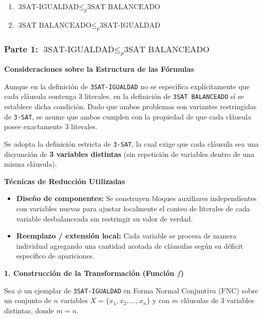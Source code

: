 \begin{enumerate}[label=\arabic*., leftmargin=*]
    \item $\text{3SAT-IGUALDAD} \le_p \text{3SAT BALANCEADO}$
    \item $\text{3SAT BALANCEADO} \le_p \text{3SAT-IGUALDAD}$
\end{enumerate}

\subsubsection*{Parte 1: $\text{3SAT-IGUALDAD} \le_p \text{3SAT BALANCEADO}$}

\vspace{0.3cm}
\noindent\textbf{Consideraciones sobre la Estructura de las Fórmulas}

Aunque en la definición de \texttt{3SAT-IGUALDAD} no se especifica explícitamente que cada cláusula contenga $3$ literales, en la definición de \texttt{3SAT BALANCEADO} sí se establece dicha condición. Dado que ambos problemas son variantes restringidas de \texttt{3-SAT}, se asume que ambos cumplen con la propiedad de que cada cláusula posee exactamente $3$ literales.

Se adopta la definición estricta de \texttt{3-SAT}, la cual exige que cada cláusula sea una disyunción de \textbf{3 variables distintas} (sin repetición de variables dentro de una misma cláusula).


\vspace{0.3cm}
\noindent\textbf{Técnicas de Reducción Utilizadas}

\begin{itemize}[leftmargin=*]
    \item \textbf{Diseño de componentes:} Se construyen bloques auxiliares independientes con variables nuevas para ajustar localmente el conteo de literales de cada variable desbalanceada sin restringir su valor de verdad.

    \item \textbf{Reemplazo / extensión local:} Cada variable se procesa de manera individual agregando una cantidad acotada de cláusulas según su déficit específico de apariciones.
\end{itemize}

\vspace{0.3cm}
\noindent\textbf{1. Construcción de la Transformación (Función $f$)}

Sea $\phi$ un ejemplar de \texttt{3SAT-IGUALDAD} en Forma Normal Conjuntiva (FNC) sobre un conjunto de $n$ variables $X = \{x_1, x_2, \dots, x_n\}$ y con $m$ cláusulas de $3$ variables distintas, donde $m = n$.

